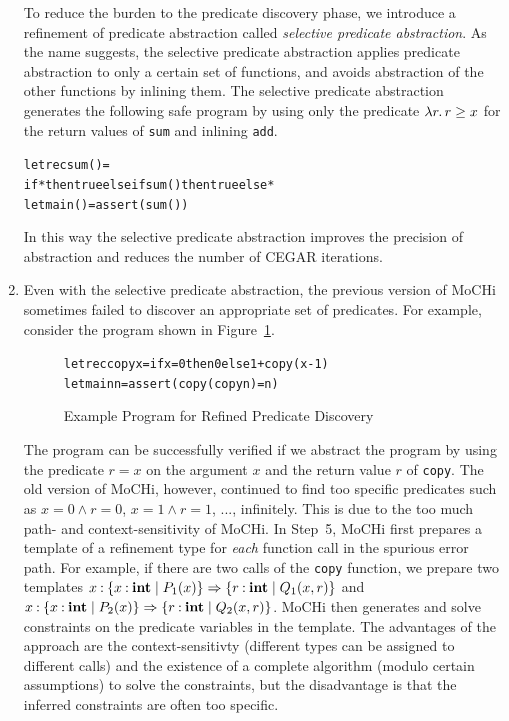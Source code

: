 \begin{enumerate}
      To reduce the burden to the predicate discovery phase, we introduce
      a refinement of predicate abstraction called \emph{selective
      predicate abstraction}.  As the name suggests, the selective
      predicate abstraction applies predicate abstraction to only a
      certain set of functions, and avoids abstraction of the other
      functions by inlining them.  The selective predicate abstraction
      generates the following safe program by using only the
      predicate $\lambda{r}.\,{r \geq x}$ for the return values of \texttt{sum}
      and inlining \texttt{add}.
\vspace{-5pt}
\begin{alltt}
 letrec sum () =
   if * then true else if sum() then true else *
 let main () = assert (sum ())
\end{alltt}
\vspace{-5pt}
      In this way the selective predicate abstraction improves the
      precision of abstraction and reduces the number of CEGAR iterations.

\item Even with the selective predicate abstraction, the previous
      version of MoCHi sometimes failed to discover an appropriate
      set of predicates. For example, consider the program
      shown in Figure~\ref{fig:copy}.
\begin{figure}[t]
\vspace{-5pt}
\begin{alltt}
 letrec copy x = if x=0 then 0 else 1 + copy (x-1)
 let main n = assert (copy (copy n) = n)
\end{alltt}
\vspace{-5pt}
\caption{Example Program for Refined Predicate Discovery}
\label{fig:copy}
\end{figure}
      The program can be successfully verified if we abstract the
      program by using the predicate \(r=x\) on the argument \(x\) and
      the return value \(r\) of \texttt{copy}.  
     The old version of MoCHi, however, continued to find
      too specific predicates such as 
      \(x=0\land r=0\), \(x=1\land r=1\), ...,
      infinitely.
      This is due to the too much path- and context-sensitivity of MoCHi.
      In Step~5, MoCHi first prepares a template of a refinement type
      for \emph{each} function call in the spurious error path.
     For example, if there are two calls of the \texttt{copy} function,
      we prepare two templates \(x\mathbin{:}\{{x\mathbin{:}\mathbf{int} \mid P_1(x)}\}\Rightarrow
       \{{r\mathbin{:}\mathbf{int} \mid Q_1(x,r)}\}\) and 
    \(x\mathbin{:}\{{x\mathbin{:}\mathbf{int} \mid P_2(x)}\}\Rightarrow
       \{{r\mathbin{:}\mathbf{int} \mid Q_2(x,r)}\}\).
     MoCHi then generates and solve
      constraints on the predicate variables in the template.
     The advantages of the approach are the context-sensitivty (different
   types can be assigned to different calls) and the existence of
   a complete algorithm (modulo certain assumptions) to solve the constraints,
    but the disadvantage is that the inferred constraints are often too
    specific.


\end{enumerate}
